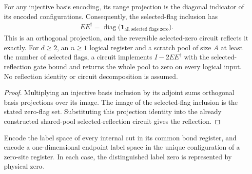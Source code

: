 \begin{lemma}
    \label{thm:mpu_initialized_flag_projection}
    \leanok
    For any injective basis encoding, its range projection is the
    diagonal indicator of its encoded configurations. Consequently,
    the selected-flag inclusion has
    \begin{align}
        EE^\dagger=\operatorname{diag}
        \bigl(\mathbf 1_{\text{all selected flags zero}}\bigr).
    \end{align}
    This is an orthogonal projection, and the reversible selected-zero
    circuit reflects it exactly. For $d\geq2$, an $n\geq1$ logical
    register and a scratch pool of size $A$ at least the number of
    selected flags, a circuit implements $I-2EE^\dagger$
    with the selected-reflection gate bound and returns the whole
    pool to zero on every logical input. No reflection identity or
    circuit decomposition is assumed.
\end{lemma}
\begin{proof}\leanok
    Multiplying an injective basis inclusion by its adjoint sums
    orthogonal basis projections over its image. The image of the
    selected-flag inclusion is the stated zero-flag set.
    Substituting this projection identity into the already constructed
    shared-pool selected-reflection circuit gives the reflection.
\end{proof}

\begin{definition}
    \label{def:mpu_endpoint_bond_encodings}
    \leanok
    Encode the label space of every internal cut in its common bond
    register, and encode a one-dimensional endpoint label space in
    the unique configuration of a zero-site register. In each case,
    the distinguished label zero is represented by physical zero.
\end{definition}

